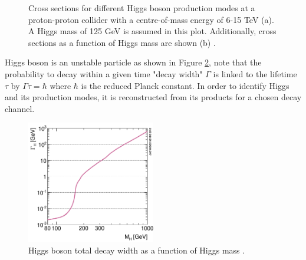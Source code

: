 \begin{figure}[htbp]
    \centering
    \caption{Cross sections for different Higgs boson production modes at a proton-proton collider with a centre-of-mass energy of 6-15 TeV (a). A Higgs mass of 125 GeV is assumed in this plot. Additionally, cross sections as a function of Higgs mass are shown (b) \cite{LHCHXSWG_Twiki}.}
    \label{fig:chap1:EWSB:HXSEC}
\end{figure}
Higgs boson is an unstable particle as shown in Figure \ref{fig:chap1:EWSB:D}, note that the probability to decay within a given time "decay width" $\Gamma$ is linked to the lifetime $\tau$ by $ \Gamma\tau = \hbar$ where $\hbar$ is the reduced Planck constant. In order to identify Higgs and its production modes, it is reconstructed from its products for a chosen decay channel. 
\begin{figure}[htbp]
    \centering
    \includegraphics[width=0.5\textwidth]{Ch1/Img/Higgs_decay.png}
    \caption{Higgs boson total decay width as a function of Higgs mass \cite{HiggsWidth}.}
    \label{fig:chap1:EWSB:D}
\end{figure}

